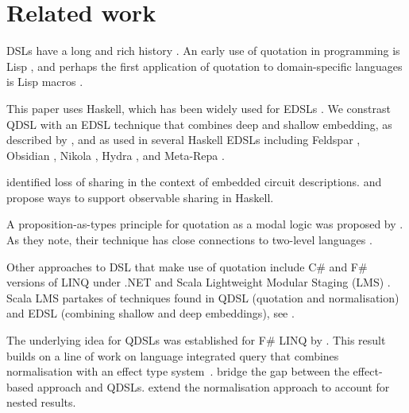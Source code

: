 \documentclass[authoryear,9pt]{sigplanconf}
\begin{document}
\section{Related work}
\label{sec:related}

DSLs have a long and rich history \citep{Bentley-1986}.
An early use of quotation in programming is Lisp \citep{McCarthy-1960},
and perhaps the first application of quotation to domain-specific
languages is Lisp macros \citep{Hart-1963}.

This paper uses Haskell, which has been widely used for EDSLs
\citep{hudak1997domain, bjesse1998lava, reid1999prototyping,
Gill:14:DSLs-and-Synthesis}.  We constrast QDSL with an EDSL technique
that combines deep and shallow embedding, as described by
\citet{svenningsson:combining}, and as used in several Haskell EDSLs
including Feldspar \citep{FELDSPAR}, Obsidian
\citep{svensson2011obsidian}, Nikola \citep{NIKOLA}, Hydra
\citep{giorgidze2011embedding}, and Meta-Repa \citep{ankner2013edsl}.


\citet{odonnell:sharing} identified loss of sharing in the context of
embedded circuit descriptions.  \citet{claessen1999observable} and
\citet{gill2009type} propose ways to support observable sharing in Haskell.

A proposition-as-types principle for quotation as a modal logic was
proposed by \citet{Davies-Pfenning-1996,Davies-Pfenning-2001}.  As
they note, their technique has close connections to two-level
languages \citep{Nielson-2005}.

Other approaches to DSL that make use of quotation include
C\# and F\# versions of LINQ under .NET
\citep{csharplinq,fsharplinq} and Scala Lightweight
Modular Staging (LMS) \citep{scalalms}.
Scala LMS partakes of techniques found in QDSL
(quotation and normalisation)
and EDSL (combining shallow and deep embeddings),
see \citet{rompf2013scala}.

The underlying idea for QDSLs was established
for F\# LINQ by \citet{cheney:linq}.
%
This result builds on a line of work on language integrated query that
combines normalisation with an effect type
system~\citep{Cooper09,LindleyC12}.
%
\citet{CheneyLRW14} bridge the gap between the effect-based approach
and QDSLs.
%
\citet{CheneyLW14} extend the normalisation approach to account for
nested results.
\end{document}
